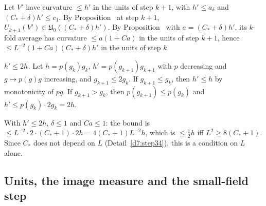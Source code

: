 \begin{detail}\label{d7:compat}
\begin{step}
Let $V'$ have curvature $\le h'$ in the units of step $k+1$, with $h'\le a_\delta$ and $(C_*+\delta)h'\le c_1$. By Proposition~ at step $k+1$, $U_{k+1}(V')\in\mathfrak U_0((C_*+\delta)h')$. By Proposition~ with $a=(C_*+\delta)h'$, its $k$-fold average has curvature $\le a(1+Ca)$ in the units of step $k+1$, hence $\le L^{-2}(1+Ca)(C_*+\delta)h'$ in the units of step $k$.
\end{step}
\begin{step}
\emph{$h'\le2h$.} Let $h=p(g_k)g_k$, $h'=p(g_{k+1})g_{k+1}$ with $p$ decreasing and $g\mapsto p(g)g$ increasing, and $g_{k+1}\le2g_k$. If $g_{k+1}\le g_k$, then $h'\le h$ by monotonicity of $pg$. If $g_{k+1}>g_k$, then $p(g_{k+1})\le p(g_k)$ and $h'\le p(g_k)\cdot2g_k=2h$.
\end{step}
\begin{step}
With $h'\le2h$, $\delta\le1$ and $Ca\le1$: the bound is $\le L^{-2}\cdot2\cdot(C_*+1)\cdot2h=4(C_*+1)L^{-2}h$, which is $\le\frac12h$ iff $L^2\ge8(C_*+1)$. Since $C_*$ does not depend on $L$ (Detail~\ref{d7:step34}), this is a condition on $L$ alone.
\end{step}
\end{detail}

\subsection{Units, the image measure and the small-field step}\label{d7:image-sec}

